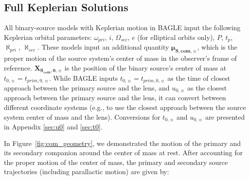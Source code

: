 \documentclass[twocolumn]{aastex701}
\newcommand{\vect}[1]{\boldsymbol{#1}}
\newcommand{\tnot}{t_{0,\sun}}
\newcommand{\thetaE}{\theta_E}
\newcommand{\uo}{u_{0,\sun}}
\newcommand{\uocom}{u_{com, 0,\sun}}
\newcommand{\mussysvec}{\vect{\mu}_{\boldsymbol{S, com},\sun}}
\newcommand{\Xscomvec}{\vect{X}_{\boldsymbol{S_{com},0},\sun}}
\newcommand{\tpnot}{t_{prim,0,\sun}}
\newcommand{\tcomnot}{t_{com,0,\sun}}
\newcommand{\w}{\omega_{pri}}
\newcommand{\bigomega}{\Omega_{sec}}
\newcommand{\inclination}{\textit{i}}
\newcommand{\eccentricity}{\textit{e}}
\newcommand{\period}{\textit{P}}
\newcommand{\al}{\aleph_{pri}}
\newcommand{\ala}{\aleph_{sec}}
\begin{document}
\subsection{Full Keplerian Solutions}
\label{sec:binsources_kep}

All binary-source models with  Keplerian motion in BAGLE input the following Keplerian orbital parameters: $\w$, $\inclination$, $\bigomega$, $\eccentricity$ (for elliptical orbits only), $\period$, $t_p$, $\al$, $\ala$. These models input an additional quantity $\mussysvec$, which is the proper motion of the source system's center of mass in the observer's frame of reference. $\Xscomvec$ is the position of the binary source's center of mass at $\tnot=\tpnot$. While BAGLE inputs $\tnot = \tpnot$ as the time of closest approach between the primary source and the lens, and $\uo$ as the closest approach between the primary source and the lens, it can convert between different coordinate systems (e.g., to use the closest approach between the source system center of mass and the lens). Conversions for
$\tnot$ and $\uo$ are presented in Appendix \ref{sec:u0} and \ref{sec:t0}.




In Figure~\ref{fig:com_geometry}, we demonstrated the motion of the primary and its secondary companion around the center of mass at rest. After accounting for the proper motion of the center of mass, the primary and secondary source trajectories (including parallactic motion) are given by: 
\end{document}
